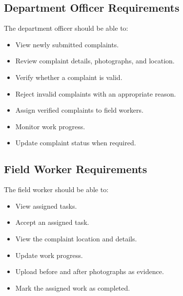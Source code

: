 \documentclass[12pt,a4paper]{article}
\begin{document}
\subsection{Department Officer Requirements}

The department officer should be able to:

\begin{itemize}[leftmargin=*]

\item View newly submitted complaints.

\item Review complaint details, photographs, and location.

\item Verify whether a complaint is valid.

\item Reject invalid complaints with an appropriate reason.

\item Assign verified complaints to field workers.

\item Monitor work progress.

\item Update complaint status when required.

\end{itemize}

\subsection{Field Worker Requirements}

The field worker should be able to:

\begin{itemize}[leftmargin=*]

\item View assigned tasks.

\item Accept an assigned task.

\item View the complaint location and details.

\item Update work progress.

\item Upload before and after photographs as evidence.

\item Mark the assigned work as completed.

\end{itemize}
\end{document}
